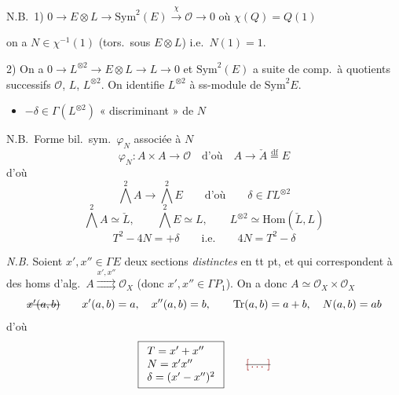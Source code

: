\documentclass[11pt,a4paper]{article}
\begin{document}
N.B.\ 1) $0 \to E \otimes L \to \mathrm{Sym}^{2}(E) \xrightarrow{\ \chi\ } \mathcal{O} \to 0$ \quad où $\chi(Q) = Q(1)$

on a $N \in \chi^{-1}(1)$ (tors.\ sous $E \otimes L$) i.e.\ $N(1) = 1$.

2) \struck{\ill{}} On a $0 \to L^{\otimes 2} \to E \otimes L \to L \to 0$ et $\mathrm{Sym}^{2}(E)$ a suite de comp.\ à quotients successifs $\mathcal{O}$, $L$, $L^{\otimes 2}$. On identifie $L^{\otimes 2}$ à ss-module de $\mathrm{Sym}^{2}E$.

\begin{itemize}
  \item $-\delta \in \Gamma(L^{\otimes 2})$ \quad « discriminant » de $N$
\end{itemize}

N.B.\ Forme  bil.\ sym.\ $\varphi_{N}$ associée à $N$
\[
  \varphi_{N} : A \times A \to \mathcal{O} \quad\text{d'où}\quad A \to \check{A} \overset{\mathrm{df}}{=} E
\]
d'où
\[
  \textstyle\bigwedge^{2} A \to \bigwedge^{2} E
  \qquad\text{d'où}\qquad \delta \in \Gamma L^{\otimes 2}
\]
\[
  \textstyle\bigwedge^{2} A \simeq \check{L}, \qquad \bigwedge^{2} E \simeq L,
  \qquad L^{\otimes 2} \simeq \mathrm{Hom}(\check{L}, L)
\]
\[
  \boxed{T^{2} - 4N = +\delta} \qquad\text{i.e.}\qquad \boxed{4N = T^{2} - \delta}
\]

\emph{N.B.} Soient $x', x'' \in \Gamma E$ \struck{\ill{}} deux sections \emph{distinctes} en tt pt, et qui correspondent à des homs d'alg.\ $A \overset{x',x''}{\rightrightarrows} \mathcal{O}_{X}$ (donc $x', x'' \in \Gamma P_{1}$). On a donc $A \simeq \mathcal{O}_{X} \times \mathcal{O}_{X}$
\[
  \text{\struck{$x'(a,b)$}} \qquad x'(a,b) = a, \quad x''(a,b) = b,
  \qquad \mathrm{Tr}(a,b) = a + b, \quad N(a,b) = ab
\]
d'où
\[
  \boxed{\begin{array}{l} T = x' + x'' \\ N = x'x'' \\ \delta = (x' - x'')^{2} \end{array}}
  \qquad \text{\struck{\ill{}}}
\]
\end{document}
